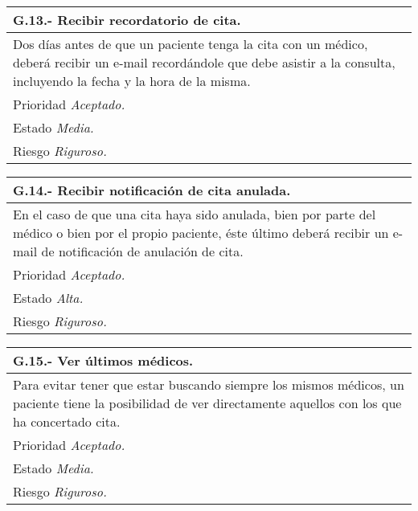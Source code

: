 	\begin{center}
	\begin{tabulary}{15cm}{|L|}
		\hline
			\bf{G.13.- Recibir recordatorio de cita.} \\
		\hline
			Dos días antes de que un paciente tenga la cita con un médico, deberá recibir un e-mail recordándole que debe asistir a la consulta, incluyendo la fecha y la hora de la misma.\\
		\hline
			Prioridad \textit{Aceptado.} \\
		\hline
			Estado \textit{Media.} \\
		\hline
			Riesgo \textit{Riguroso.} \\
		\hline
	\end{tabulary}
	\end{center}

	\begin{center}
	\begin{tabulary}{15cm}{|L|}
		\hline
			\bf{G.14.- Recibir notificación de cita anulada.} \\
		\hline
			En el caso de que una cita haya sido anulada, bien por parte del médico o bien por el propio paciente, éste último deberá recibir un e-mail de notificación de anulación de cita.\\
		\hline
			Prioridad \textit{Aceptado.} \\
		\hline
			Estado \textit{Alta.} \\
		\hline
			Riesgo \textit{Riguroso.} \\
		\hline
	\end{tabulary}
	\end{center}

	\begin{center}
	\begin{tabulary}{15cm}{|L|}
		\hline
			\bf{G.15.- Ver últimos médicos.} \\
		\hline
			Para evitar tener que estar buscando siempre los mismos médicos, un paciente tiene la posibilidad de ver directamente aquellos con los que ha concertado cita. \\
		\hline
			Prioridad \textit{Aceptado.} \\
		\hline
			Estado \textit{Media.} \\
		\hline
			Riesgo \textit{Riguroso.} \\
		\hline
	\end{tabulary}
	\end{center}

